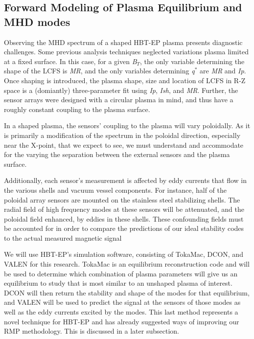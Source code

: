 \documentclass[aps,prl,twocolumn,superscriptaddress,groupedaddress]{revtex4}  %
\begin{document}
\subsection{Forward Modeling of Plasma Equilibrium and MHD modes}
	Observing the MHD spectrum of a shaped HBT-EP plasma presents diagnostic challenges.  Some previous analysis techniques neglected variations plasma limited at a fixed surface.  In this case, for a given \textit{B$_T$}, the only variable determining the shape of the LCFS is \textit{MR}, and the only variables determining  \textit{q$^*$} are \textit{MR} and \textit{Ip}. Once shaping is introduced, the plasma shape, size and location of LCFS in R-Z space is a (domiantly) three-parameter fit using \textit{Ip}, \textit{Ish}, and \textit{MR}.  Further, the sensor arrays were designed with a circular plasma in mind, and thus have a roughly constant coupling to the plasma surface.\par
	In a shaped plasma, the sensors' coupling to the plasma will vary poloidally.  As it is primarily a modification of the spectrum in the poloidal direction, especially near the X-point, that we expect to see, we must understand and accommodate for the varying the separation between the external sensors and the plasma surface.\par
	Additionally, each sensor's measurement is affected by eddy currents that flow in the various shells and vacuum vessel components.  For instance, half of the poloidal array sensors are mounted on the stainless steel stabilizing shells.  The radial field of high frequency modes at these sensors will be attenuated, and the poloidal field enhanced, by eddies in these shells.  These confounding fields must be accounted for in order to compare the predictions of our ideal stability codes to the actual measured magnetic signal\par
	We will use HBT-EP's simulation software, consisting of TokaMac, DCON, and VALEN for this research.  TokaMac is an equilibrium reconstruction code and will be used to determine which combination of plasma parameters will give us an equilibrium to study that is most similar to an unshaped plasma of interest.  DCON will then return the stability and shape of the modes for that equilibrium, and VALEN will be used to predict the signal at the sensors of those modes as well as the eddy currents excited by the modes.  This last method represents a novel technique for HBT-EP and has already suggested ways of improving our RMP methodology.  This is discussed in a later subsection.
\end{document}
